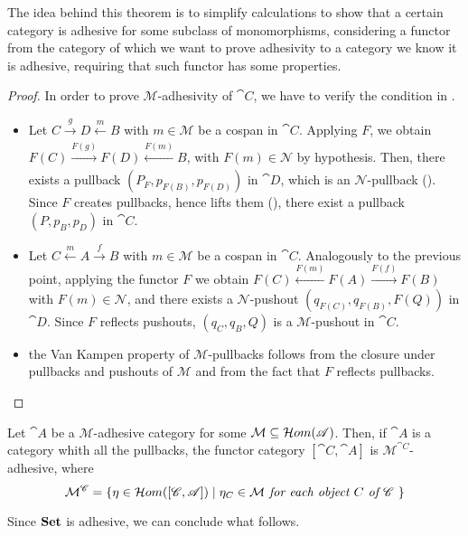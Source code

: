 The idea behind this theorem is to simplify calculations to show that a certain category is adhesive for some subclass of monomorphisms, considering a functor from the category of which we want to prove adhesivity to a category we know it is adhesive, requiring that such functor has some properties.

\begin{proof}
    In order to prove $\mathcal M$-adhesivity of $\cat C$, we have to verify the condition in .
    \begin{itemize}
        \item Let $C \xrightarrow[]{g} D \xleftarrow[]{m} B$ with $m \in \mathcal M$ be a cospan in $\cat C$. Applying $F$, we obtain $F(C) \xrightarrow[]{F(g)} F(D) \xleftarrow[]{F(m)} B$, with $F(m) \in \mathcal{N}$ by hypothesis. Then, there exists a pullback $(P_F, p_{F(B)}, p_{F(D)})$ in $\cat D$, which is an $\mathcal N$-pullback (). Since $F$ creates pullbacks, hence lifts them (), there exist a pullback $(P, p_B, p_D)$ in $\cat C$.
        \item Let $C \xleftarrow{m} A \xrightarrow{f} B$ with $ m \in \mathcal M$ be a cospan in $\cat C$. Analogously to the previous point, applying the functor $F$ we obtain $F(C) \xleftarrow{F(m)} F(A) \xrightarrow{F(f)} F(B)$ with $ F(m) \in \mathcal N$, and there exists a $\mathcal N$-pushout $(q_{F(C)}, q_{F(B)}, F(Q))$ in $\cat D$. Since $F$ reflects pushouts, $(q_C, q_B, Q)$ is a $\mathcal{M}$-pushout in $\cat C$.
        \item the Van Kampen property of $\mathcal M$-pullbacks follows from the closure under pullbacks and pushouts of $\mathcal M$ and from the fact that $F$ reflects pullbacks.
    \end{itemize}
    
\end{proof}

\begin{cor}\label{cor:adhesivity_functor_categories}
    Let $\cat A$ be a $\mathcal M$-adhesive category for some $\mathcal M \subseteq \mathcal{H}om(\mathscr{A})$. Then, if $\cat A$ is a category whith all the pullbacks, the functor category $[\cat C, \cat A]$ is $\mathcal M^{\cat C}$-adhesive, where
    \[
        \mathcal{M}^{\mathscr{C}} = \{\eta \in \mathcal{H}om([\mathscr{C}, \mathscr{A}]) \mid \eta_C \in \mathcal M \textit{ for each object $C$ of $\mathscr{C}$ }\}
    \]
\end{cor}

Since $\mathbf{Set}$ is adhesive, we can conclude what follows.

